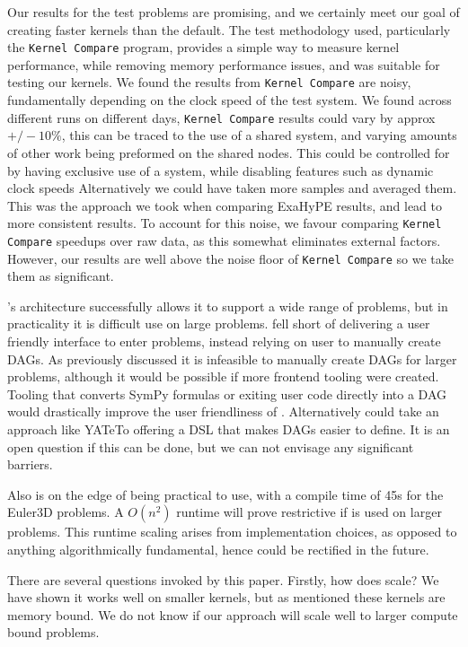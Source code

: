 Our results for the test problems are promising, and we certainly meet our goal of creating faster kernels than the default.
The test methodology used, particularly the \texttt{Kernel Compare} program, provides a simple way to measure kernel performance, while removing memory performance issues, and was suitable for testing our kernels.
We found the results from \texttt{Kernel Compare} are noisy, fundamentally depending on the clock speed of the test system.
We found across different runs on different days, \texttt{Kernel Compare} results could vary by approx $+/-10\%$, this can be traced to the use of a shared system, and varying amounts of other work being preformed on the shared nodes.
This could be controlled for by having exclusive use of a system, while disabling features such as dynamic clock speeds
Alternatively we could have taken more samples and averaged them.
This was the approach we took when comparing ExaHyPE results, and lead to more consistent results.
To account for this noise, we favour comparing \texttt{Kernel Compare} speedups over raw data, as this somewhat eliminates external factors.
However, our results are well above the noise floor of \texttt{Kernel Compare} so we take them as significant.

\phlat{}'s architecture successfully allows it to support a wide range of problems, but in practicality it is difficult use \phlat on large problems.
\phlat fell short of delivering a user friendly interface to enter problems, instead relying on user to manually create DAGs.
As previously discussed it is infeasible to manually create DAGs for larger problems, although it would be possible if more frontend tooling were created.
Tooling that converts SymPy formulas \cite{sympy} or exiting user code directly into a DAG would drastically improve the user friendliness of \phlat.
Alternatively \phlat could take an approach like YATeTo offering a DSL that makes DAGs easier to define.
It is an open question if this can be done, but we can not envisage any significant barriers.

Also \phlat is on the edge of being practical to use, with a compile time of 45s for the Euler3D problems.
A $O(n^2)$ runtime will prove restrictive if \phlat is used on larger problems.
This runtime scaling arises from implementation choices, as opposed to anything algorithmically fundamental, hence could be rectified in the future.

There are several questions invoked by this paper.
Firstly, how does \phlat scale?
We have shown it works well on smaller kernels, but as mentioned these kernels are memory bound.
We do not know if our approach will scale well to larger compute bound problems.

